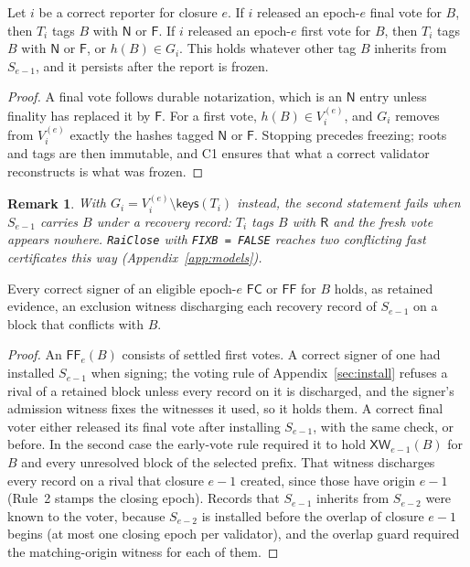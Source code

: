 \documentclass[conference]{IEEEtran}
\newtheorem{remark}{Remark}
\newcommand{\XW}{\mathsf{XW}}
\newcommand{\FC}{\mathsf{FC}}
\newcommand{\FF}{\mathsf{FF}}
\newcommand{\keys}{\mathsf{keys}}
\newcommand{\tagR}{\mathsf{R}}
\newcommand{\tagN}{\mathsf{N}}
\newcommand{\tagF}{\mathsf{F}}
\begin{document}
\begin{lemma}
\label{lem:exposure}
Let $i$ be a correct reporter for closure $e$. If $i$ released an epoch-$e$ final vote for $B$, then $T_i$ tags $B$ with $\tagN$ or $\tagF$. If $i$ released an epoch-$e$ first vote for $B$, then $T_i$ tags $B$ with $\tagN$ or $\tagF$, or $h(B)\in G_i$. This holds whatever other tag $B$ inherits from $S_{e-1}$, and it persists after the report is frozen.
\end{lemma}
\begin{proof}
A final vote follows durable notarization, which is an $\tagN$ entry unless finality has replaced it by $\tagF$. For a first vote, $h(B)\in V_i^{(e)}$, and $G_i$ removes from $V_i^{(e)}$ exactly the hashes tagged $\tagN$ or $\tagF$. Stopping precedes freezing; roots and tags are then immutable, and C1 ensures that what a correct validator reconstructs is what was frozen.
\end{proof}
\begin{remark}
With $G_i=V_i^{(e)}\setminus\keys(T_i)$ instead, the second statement fails when $S_{e-1}$ carries $B$ under a recovery record: $T_i$ tags $B$ with $\tagR$ and the fresh vote appears nowhere. \texttt{RaiClose} with \texttt{FIXB = FALSE} reaches two conflicting fast certificates this way (Appendix~\ref{app:models}).
\end{remark}

\begin{lemma}
\label{lem:holds}
Every correct signer of an eligible epoch-$e$ $\FC$ or $\FF$ for $B$ holds, as retained evidence, an exclusion witness discharging each recovery record of $S_{e-1}$ on a block that conflicts with $B$.
\end{lemma}
\begin{proof}
An $\FF_e(B)$ consists of settled first votes. A correct signer of one had installed $S_{e-1}$ when signing; the voting rule of Appendix~\ref{sec:install} refuses a rival of a retained block unless every record on it is discharged, and the signer's admission witness fixes the witnesses it used, so it holds them. A correct final voter either released its final vote after installing $S_{e-1}$, with the same check, or before. In the second case the early-vote rule required it to hold $\XW_{e-1}(B)$ for $B$ and every unresolved block of the selected prefix. That witness discharges every record on a rival that closure $e-1$ created, since those have origin $e-1$ (Rule~2 stamps the closing epoch). Records that $S_{e-1}$ inherits from $S_{e-2}$ were known to the voter, because $S_{e-2}$ is installed before the overlap of closure $e-1$ begins (at most one closing epoch per validator), and the overlap guard required the matching-origin witness for each of them.
\end{proof}
\end{document}
